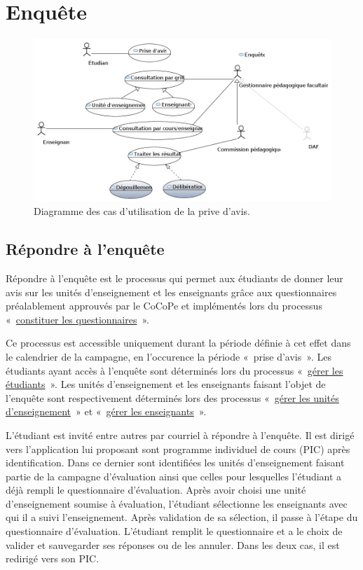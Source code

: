 \documentclass[a4paper,11pt]{report}
\begin{document}
\newpage
\section{Enquête}

\begin{figure}[ht]
\includegraphics[width=\linewidth]{workspace/evalens-usecases/prise_avis.png}
\caption{Diagramme des cas d'utilisation de la prive d'avis.}
\label{fig:usecase-avis}
\end{figure}

\subsection{Répondre à l'enquête}
Répondre à l'enquête est le processus qui permet aux étudiants de donner leur avis sur les unités d'enseignement et les enseignants grâce aux questionnaires préalablement approuvés par le CoCoPe et implémentés lors du processus «~\hyperref[sec:constituer-quest]{constituer les questionnaires}~».

Ce processus est accessible uniquement durant la période définie à cet effet dans le calendrier de la campagne, en l'occurence la période «~prise d'avis~».
Les étudiants ayant accès à l'enquête sont déterminés lors du processus «~\hyperref[sec:gerer-etud]{gérer les étudiants}~».
Les unités d'enseignement et les enseignants faisant l'objet de l'enquête sont respectivement déterminés lors des processus «~\hyperref[sec:gerer-ue]{gérer les unités d'enseignement}~» et «~\hyperref[sec:gerer-enseignant]{gérer les enseignants}~».

L'étudiant est invité entre autres par courriel à répondre à l'enquête.
Il est dirigé vers l'application lui proposant sont programme individuel de cours (PIC) après identification.
Dans ce dernier sont identifiées les unités d'enseignement faisant partie de la campagne d'évaluation ainsi que celles pour lesquelles l'étudiant a déjà rempli le questionnaire d'évaluation.
Après avoir choisi une unité d'enseignement soumise à évaluation, l'étudiant sélectionne les enseignants avec qui il a suivi l'enseignement.
Après validation de sa sélection, il passe à l'étape du questionnaire d'évaluation.
L'étudiant remplit le questionnaire et a le choix de valider et sauvegarder ses réponses ou de les annuler.
Dans les deux cas, il est redirigé vers son PIC.
\end{document}
